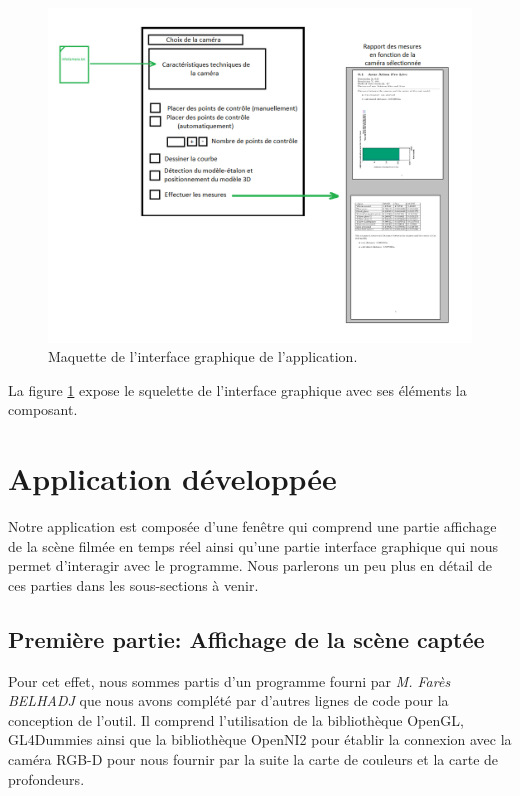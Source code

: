 \documentclass[a4paper, 12pt]{book}
\newcounter{program}[subsection]
\begin{document}
\begin{center}
	\begin{figure}[H]
  		\hspace{-1.5cm}
 		\includegraphics[scale=0.5]{images/maquetteApp2.png} \hspace{2cm}
  		\caption{Maquette de l'interface graphique de l'application.\label{fig-interface}}
	\end{figure}
\end{center}

La figure \ref{fig-interface} expose le squelette de l'interface graphique avec ses éléments la composant.

\section{Application développée}
Notre application est composée d'une fenêtre qui comprend une partie affichage de la scène filmée en temps réel ainsi qu'une partie interface graphique qui nous permet d'interagir avec le programme. Nous parlerons un peu plus en détail de ces parties dans les sous-sections à venir.
\subsection{Première partie: Affichage de la scène captée }
Pour cet effet, nous sommes partis d'un programme fourni par \emph{M. Farès BELHADJ} que nous avons complété par d'autres lignes de code pour la conception de l'outil. Il comprend l'utilisation de la bibliothèque OpenGL, GL4Dummies ainsi que la bibliothèque OpenNI2 pour établir la connexion avec la caméra RGB-D pour nous fournir par la suite la carte de couleurs et la carte de profondeurs. 
\end{document}
